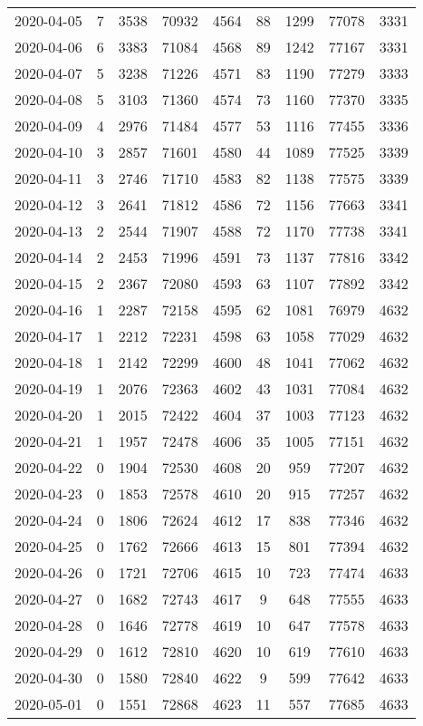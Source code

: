 \begin{longtable}{ccccccccc}
2020-04-05&7&3538&70932&4564&88&1299&77078&3331\\
2020-04-06&6&3383&71084&4568&89&1242&77167&3331\\
2020-04-07&5&3238&71226&4571&83&1190&77279&3333\\
2020-04-08&5&3103&71360&4574&73&1160&77370&3335\\
2020-04-09&4&2976&71484&4577&53&1116&77455&3336\\
2020-04-10&3&2857&71601&4580&44&1089&77525&3339\\
2020-04-11&3&2746&71710&4583&82&1138&77575&3339\\
2020-04-12&3&2641&71812&4586&72&1156&77663&3341\\
2020-04-13&2&2544&71907&4588&72&1170&77738&3341\\
2020-04-14&2&2453&71996&4591&73&1137&77816&3342\\
2020-04-15&2&2367&72080&4593&63&1107&77892&3342\\
2020-04-16&1&2287&72158&4595&62&1081&76979&4632\\
2020-04-17&1&2212&72231&4598&63&1058&77029&4632\\
2020-04-18&1&2142&72299&4600&48&1041&77062&4632\\
2020-04-19&1&2076&72363&4602&43&1031&77084&4632\\
2020-04-20&1&2015&72422&4604&37&1003&77123&4632\\
2020-04-21&1&1957&72478&4606&35&1005&77151&4632\\
2020-04-22&0&1904&72530&4608&20&959&77207&4632\\
2020-04-23&0&1853&72578&4610&20&915&77257&4632\\
2020-04-24&0&1806&72624&4612&17&838&77346&4632\\
2020-04-25&0&1762&72666&4613&15&801&77394&4632\\
2020-04-26&0&1721&72706&4615&10&723&77474&4633\\
2020-04-27&0&1682&72743&4617&9&648&77555&4633\\
2020-04-28&0&1646&72778&4619&10&647&77578&4633\\
2020-04-29&0&1612&72810&4620&10&619&77610&4633\\
2020-04-30&0&1580&72840&4622&9&599&77642&4633\\
2020-05-01&0&1551&72868&4623&11&557&77685&4633\\
\hline
\end{longtable}